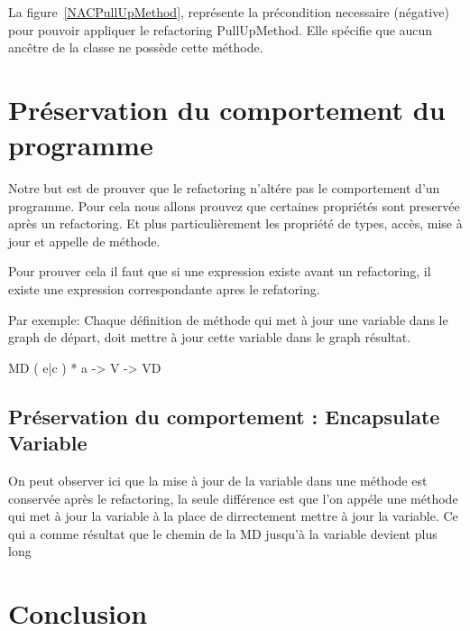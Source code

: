 \documentclass[a4paper, 10pt]{article}
\begin{document}
La figure~\ref{NACPullUpMethod}, représente la précondition necessaire (négative) pour pouvoir appliquer le refactoring PullUpMethod.
Elle spécifie que aucun ancêtre de la classe ne possède cette méthode.

\section{Préservation du comportement du programme}

Notre but est de prouver que le refactoring n'altére pas le comportement d'un programme. Pour cela nous allons prouvez que certaines propriétés sont preservée après un refactoring. Et plus particulièrement les propriété de types, accès, mise à jour et appelle de méthode.

Pour prouver cela il faut que si une expression existe avant un refactoring, il existe une expression correspondante apres le refatoring. 

Par exemple: Chaque définition de méthode qui met à jour une variable dans le graph de départ, doit mettre à jour cette variable dans le graph résultat.

MD ( e|c ) * a -> V -> VD

\subsection{Préservation du comportement : Encapsulate Variable}

On peut observer ici que la mise à jour de la variable dans une méthode est conservée après le refactoring, la seule différence est que l'on appéle une méthode qui met à jour la variable à la place de
dirrectement mettre à jour la variable. Ce qui a comme résultat que le chemin de la MD jusqu'à la variable devient plus long


\section{Conclusion}
\end{document}
